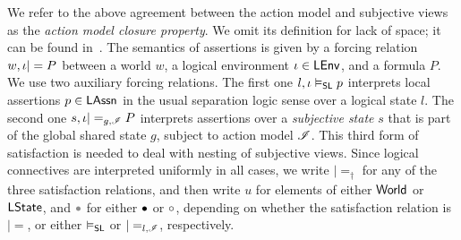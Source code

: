 We refer to the above agreement between the action model and subjective views as the \emph{action model closure property}. We omit its definition for lack
of space; it can be found in~\cite{colosl-tr14}. The semantics of \colosl assertions is given by a forcing relation
$w,\iota|= P$ between a world $w$, a logical environment
$\iota\in\mathsf{LEnv}$, and a formula $P$. We use two auxiliary forcing
relations. The first one $l,\iota\mathrel{\vDash_{\mathsf{SL}}} p$ interprets local assertions
$p\in\mathsf{LAssn}$ in the usual separation logic sense over a logical
state $l$. The second one $s,\iota|=_{g,\mathscr{I}} P$ interprets
assertions over a \emph{subjective state} $s$ that is part of the
global shared state $g$, subject to action model $\mathscr{I}$. This third
form of satisfaction is needed to deal with nesting of subjective
views.
Since logical connectives are interpreted uniformly in all cases, we
write $|=_\dagger$ for any of the three satisfaction relations, and
then write $u$ for elements of either $\mathsf{World}$ or $\mathsf{LState}$, and
$\grey$ for either $\bullet$ or $\circ$, depending on whether
the satisfaction relation is $|=$, or either $\mathrel{\vDash_{\mathsf{SL}}}$ or
$|=_{l,\mathscr{I}}$, respectively.

